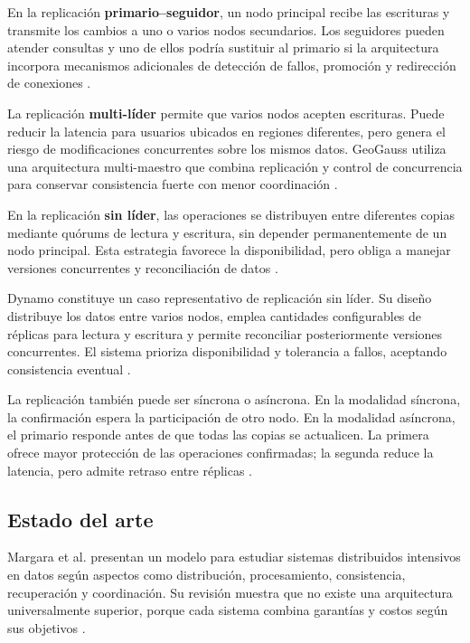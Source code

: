 \documentclass[11pt,a4paper]{article}
\begin{document}
En la replicación \textbf{primario--seguidor}, un nodo principal recibe las escrituras y transmite los cambios a uno o varios nodos secundarios. Los seguidores pueden atender consultas y uno de ellos podría sustituir al primario si la arquitectura incorpora mecanismos adicionales de detección de fallos, promoción y redirección de conexiones \cite{margara2023}.

La replicación \textbf{multi-líder} permite que varios nodos acepten escrituras. Puede reducir la latencia para usuarios ubicados en regiones diferentes, pero genera el riesgo de modificaciones concurrentes sobre los mismos datos. GeoGauss utiliza una arquitectura multi-maestro que combina replicación y control de concurrencia para conservar consistencia fuerte con menor coordinación \cite{zhou2023}.

En la replicación \textbf{sin líder}, las operaciones se distribuyen entre diferentes copias mediante quórums de lectura y escritura, sin depender permanentemente de un nodo principal. Esta estrategia favorece la disponibilidad, pero obliga a manejar versiones concurrentes y reconciliación de datos \cite{decandia2007}.

Dynamo constituye un caso representativo de replicación sin líder. Su diseño distribuye los datos entre varios nodos, emplea cantidades configurables de réplicas para lectura y escritura y permite reconciliar posteriormente versiones concurrentes. El sistema prioriza disponibilidad y tolerancia a fallos, aceptando consistencia eventual \cite{decandia2007}.

La replicación también puede ser síncrona o asíncrona. En la modalidad síncrona, la confirmación espera la participación de otro nodo. En la modalidad asíncrona, el primario responde antes de que todas las copias se actualicen. La primera ofrece mayor protección de las operaciones confirmadas; la segunda reduce la latencia, pero admite retraso entre réplicas \cite{abadi2012,margara2023}.

\subsection{Estado del arte}
Margara et al. presentan un modelo para estudiar sistemas distribuidos intensivos en datos según aspectos como distribución, procesamiento, consistencia, recuperación y coordinación. Su revisión muestra que no existe una arquitectura universalmente superior, porque cada sistema combina garantías y costos según sus objetivos \cite{margara2023}.
\end{document}
